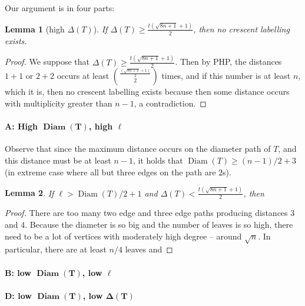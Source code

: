 \documentclass[12]{article}
\DeclareMathOperator{\diam}{Diam}
\newtheorem{lem}{Lemma} %
\theoremstyle{definition}
\begin{document}
	Our argument is in four parts:
	
	\begin{lem}[high $\Delta(T)$]
		If $\Delta(T) \geq \frac{t(\sqrt{8n+1}+1)}{2}$, then no crescent labelling exists.
	\end{lem}
	
	\begin{proof}
		We suppose that $\Delta(T) \geq \frac{t(\sqrt{8n+1}+1)}{2}$.  Then by PHP, the distances $1+1$ or $2+2$ occurs at least ${\frac{(\sqrt{8n+1}+1)}{2} \choose 2}$ times, and if this number is at least $n$, which it is, then no crescent labelling exists because then some distance occurs with multiplicity greater than $n-1$, a contradiction. \qedhere
	\end{proof}
	
	
	\paragraph{\textbf{A:}	High $\mathbf{\diam(T)}$, high $\mathbf{\ell}$}
	
	Observe that since the maximum distance occurs on the diameter path of $T$, and this distance must be at least $n-1$, it holds that $\diam(T) \geq (n-1)/2 + 3$ (in extreme case where all but three edges on the path are $2$s).
	
	\begin{lem}
		If $\ell > \diam(T)/2 + 1$ and $\Delta(T) < \frac{t(\sqrt{8n+1}+1)}{2}$, then 
	\end{lem}

	\begin{proof}
		There are too many two edge and three edge paths producing distances 3 and 4.  Because the diameter is so big and the number of leaves is so high, there need to be a lot of vertices with moderately high degree -- around $\sqrt{n}$.  In particular, there are at least $n/4$ leaves and 
	\end{proof}
	
	\paragraph{\textbf{B:}	low $\mathbf{\diam(T)}$, low $\mathbf{\ell}$}

	
	\paragraph{\textbf{D:}	low $\mathbf{\diam(T)}$, low $\mathbf{\Delta(T)}$}
\fi
	
\end{document}

